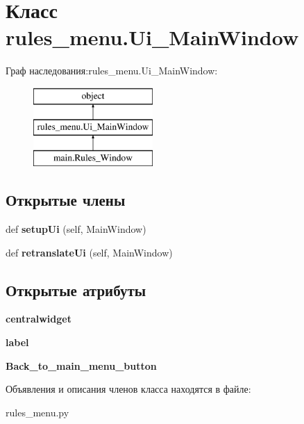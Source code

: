 \hypertarget{classrules__menu_1_1_ui___main_window}{}\section{Класс rules\+\_\+menu.\+Ui\+\_\+\+Main\+Window}
\label{classrules__menu_1_1_ui___main_window}
Граф наследования\+:rules\+\_\+menu.\+Ui\+\_\+\+Main\+Window\+:\begin{figure}[H]
\begin{center}
\leavevmode
\includegraphics[height=3.000000cm]{classrules__menu_1_1_ui___main_window}
\end{center}
\end{figure}
\subsection*{Открытые члены}
\begin{DoxyCompactItemize}
\item 
\mbox{\label{classrules__menu_1_1_ui___main_window_a820707d0f168e1730de493150a686ce1}} 
def {\bfseries setup\+Ui} (self, Main\+Window)
\item 
\mbox{\label{classrules__menu_1_1_ui___main_window_ab0f9c3d555af3aa8b18933294e1385ac}} 
def {\bfseries retranslate\+Ui} (self, Main\+Window)
\end{DoxyCompactItemize}
\subsection*{Открытые атрибуты}
\begin{DoxyCompactItemize}
\item 
\mbox{\label{classrules__menu_1_1_ui___main_window_a68f503a03e2be66620fa0c6022fd3ce7}} 
{\bfseries centralwidget}
\item 
\mbox{\label{classrules__menu_1_1_ui___main_window_a77c2a92e95229ad7944cea51eba99b12}} 
{\bfseries label}
\item 
\mbox{\label{classrules__menu_1_1_ui___main_window_a6c44d505a286f5bf7370bdaab5bca356}} 
{\bfseries Back\+\_\+to\+\_\+main\+\_\+menu\+\_\+button}
\end{DoxyCompactItemize}


Объявления и описания членов класса находятся в файле\+:\begin{DoxyCompactItemize}
\item 
rules\+\_\+menu.\+py\end{DoxyCompactItemize}
